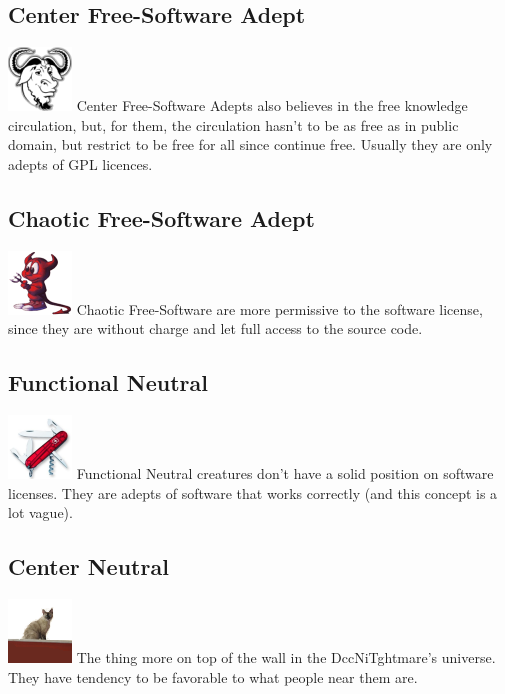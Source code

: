 \documentclass[ letterpaper,12pt]{article}
\begin{document}
\subsection{Center Free-Software Adept}\includegraphics{../data/alignment/Img/gnu.png} Center Free-Software Adepts also believes in the free knowledge circulation, but, for them, the circulation hasn't to be as free as in public domain, but restrict to be free for all since continue free. Usually they are only adepts of GPL licences.

\subsection{Chaotic Free-Software Adept}\includegraphics{../data/alignment/Img/beastie.png} Chaotic Free-Software are more permissive to the software license, since they are without charge and let full access to the source code.

\subsection{Functional Neutral} \includegraphics{../data/alignment/Img/canivete.png} Functional Neutral creatures don't have a solid position on software licenses. They are adepts of software that works correctly (and this concept is a lot vague).

\subsection{Center Neutral} \includegraphics{../data/alignment/Img/muro.png} The thing more on top of the wall in the DccNiTghtmare's universe.  They have tendency to be favorable to what people near them are.
\end{document}

